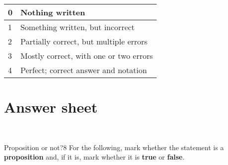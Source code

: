 \documentclass[a4paper,12pt]{book}
\begin{document}
    \begin{center}
        \begin{tabular}{ | l | l | }
            \hline
            0 & Nothing written \\ \hline
            1 & Something written, but incorrect \\ \hline
            2 & Partially correct, but multiple errors \\ \hline
            3 & Mostly correct, with one or two errors \\ \hline
            4 & Perfect; correct answer and notation \\ \hline

        \end{tabular}
    \end{center}



    \newpage{}
    \section*{Answer sheet}

    ~\\
    \begin{answersheetquestion}{1}{Proposition or not?}{8}
        For the following, mark whether the statement is a \textbf{proposition} and,
        if it is, mark whether it is \textbf{true} or \textbf{false}.
    \end{answersheetquestion}
\end{document}
